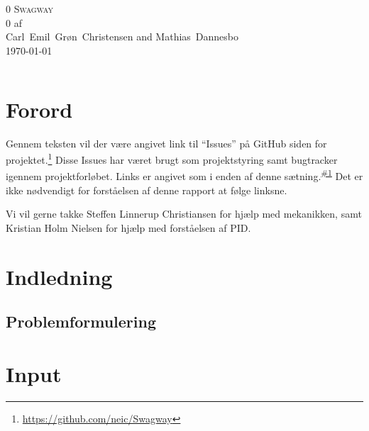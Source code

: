 \documentclass[a4paper,twoside,article,danish,table]{memoir}
\newcommand{\authorvar}{Carl~Emil~Grøn~Christensen and Mathias~Dannesbo}
\newcommand{\pretitlevar}{0}
\newcommand{\titlevar}{Swagway}
\newcommand{\subtitlevar}{0}
\newcommand{\datevar}{\today}
\newcommand{\issue}[1]{\textsuperscript{\textcolor{blue!80!black}{\href{https://github.com/neic/Swagway/issues/#1}{\##1}}}}
\begin{document}

\begin{center}
  \if\pretitlevar 0
  \else{\Large\pretitlevar\\} \fi
  \textsc{\HUGE\titlevar\\}
  \if\subtitlevar 0
  \else {\Large\subtitlevar\\} \fi
  {\LARGE 
  af\\
   \authorvar}\\
 \datevar\\
\end{center}

\vfill
\begin{abstract} %
\end{abstract}\vfill
\noindent
\begin{tabular*}{\textwidth}{@{\extracolsep{\fill}} ll}

\end{tabular*}

\thispagestyle{empty}
\clearpage

\chapter*{Forord}\label{chap:for}
Gennem teksten vil der være angivet link til “Issues” på GitHub siden for projektet.\footnote{\url{https://github.com/neic/Swagway}} Disse Issues har været brugt som projektstyring samt bugtracker igennem projektforløbet. Links er angivet som i enden af denne sætning.\issue{1} Det er ikke nødvendigt for forståelsen af denne rapport at følge linksne.

Vi vil gerne takke Steffen Linnerup Christiansen for hjælp med mekanikken, samt Kristian Holm Nielsen for hjælp med forståelsen af PID.

\clearpage \setcounter{tocdepth}{1} \tableofcontents \clearpage

\chapter{Indledning}\label{chap:ind}
\section{Problemformulering}

\chapter{Input}
\end{document}
